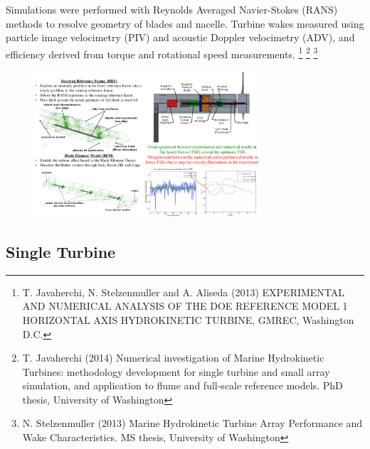 \documentclass[xcolor=x11names,compress]{beamer}
\renewcommand{\(}{\begin{columns}}
\renewcommand{\)}{\end{columns}}
\newcommand{\<}[1]{\begin{column}{#1}}
\renewcommand{\>}{\end{column}}
\begin{document}
	\begin{frame}{}

		\scriptsize Simulations were performed with Reynolds Averaged Navier-Stokes (RANS) methods 
		to resolve geometry of blades and nacelle. Turbine wakes measured using
		particle image velocimetry (PIV) and acoustic Doppler velocimetry (ADV), and efficiency derived from
		torque and rotational speed measurements. 
		\footnote{\tiny T. Javaherchi, N. Stelzenmuller and A. Aliseda (2013) EXPERIMENTAL AND NUMERICAL ANALYSIS OF THE DOE REFERENCE MODEL 1 HORIZONTAL AXIS HYDROKINETIC TURBINE, GMREC, Washington D.C. }
		\footnote{\tiny T. Javaherchi (2014) Numerical investigation of Marine Hydrokinetic Turbines: methodology development for single turbine and small array simulation, and application to flume and full-scale reference models. PhD thesis, University of Washington }
		\footnote{\tiny N. Stelzenmuller (2013) Marine Hydrokinetic Turbine Array Performance and Wake Characteristics. MS thesis, University of Washington }

		\vspace{-5pt}

		\begin{figure}[p]
		    \centering
		    \includegraphics[width=0.75\textwidth]{figures/validation-RANS-experiment-setup.png}
		    \label{fig:RANS-and-experiment-setup}
		\end{figure}

	\end{frame}


\subsection{Single Turbine}
	
\end{document}

